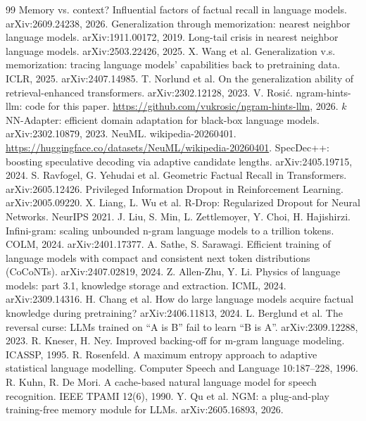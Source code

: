 \documentclass[11pt]{article}
\begin{document}
\begin{thebibliography}{99}
 Memory vs. context? Influential factors of factual recall in language models. arXiv:2609.24238, 2026.
 Generalization through memorization: nearest neighbor language models. arXiv:1911.00172, 2019.
 Long-tail crisis in nearest neighbor language models. arXiv:2503.22426, 2025.
 X. Wang et al. Generalization v.s. memorization: tracing language models' capabilities back to pretraining data. ICLR, 2025. arXiv:2407.14985.
 T. Norlund et al. On the generalization ability of retrieval-enhanced transformers. arXiv:2302.12128, 2023.
 V. Rosi\'c. ngram-hints-llm: code for this paper. \url{https://github.com/vukrosic/ngram-hints-llm}, 2026.
 $k$NN-Adapter: efficient domain adaptation for black-box language models. arXiv:2302.10879, 2023.
 NeuML. wikipedia-20260401. \url{https://huggingface.co/datasets/NeuML/wikipedia-20260401}.
 SpecDec++: boosting speculative decoding via adaptive candidate lengths. arXiv:2405.19715, 2024.
 S. Ravfogel, G. Yehudai et al. Geometric Factual Recall in Transformers. arXiv:2605.12426.
 Privileged Information Dropout in Reinforcement Learning. arXiv:2005.09220.
 X. Liang, L. Wu et al. R-Drop: Regularized Dropout for Neural Networks. NeurIPS 2021.
 J. Liu, S. Min, L. Zettlemoyer, Y. Choi, H. Hajishirzi. Infini-gram: scaling unbounded n-gram language models to a trillion tokens. COLM, 2024. arXiv:2401.17377.
 A. Sathe, S. Sarawagi. Efficient training of language models with compact and consistent next token distributions (CoCoNTs). arXiv:2407.02819, 2024.
 Z. Allen-Zhu, Y. Li. Physics of language models: part 3.1, knowledge storage and extraction. ICML, 2024. arXiv:2309.14316.
 H. Chang et al. How do large language models acquire factual knowledge during pretraining? arXiv:2406.11813, 2024.
 L. Berglund et al. The reversal curse: LLMs trained on ``A is B'' fail to learn ``B is A''. arXiv:2309.12288, 2023.
 R. Kneser, H. Ney. Improved backing-off for m-gram language modeling. ICASSP, 1995.
 R. Rosenfeld. A maximum entropy approach to adaptive statistical language modelling. Computer Speech and Language 10:187--228, 1996.
 R. Kuhn, R. De Mori. A cache-based natural language model for speech recognition. IEEE TPAMI 12(6), 1990.
 Y. Qu et al. NGM: a plug-and-play training-free memory module for LLMs. arXiv:2605.16893, 2026.

\end{thebibliography}
\end{document}
